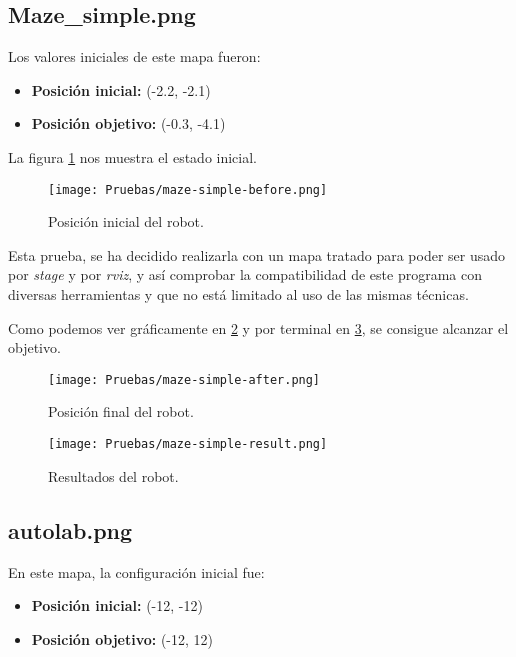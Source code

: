\documentclass[a4paper, 11pt]{article}
\begin{document}
	\subsection{Maze\_simple.png}
		Los valores iniciales de este mapa fueron:
		
		\begin{itemize}
			\item \textbf{Posición inicial:} (-2.2, -2.1)
			\item \textbf{Posición objetivo:} (-0.3, -4.1)
		\end{itemize}
		
		La figura \ref{begin-ms} nos muestra el estado inicial.
		
		\begin{figure}[H]
			\centering
			\texttt{[image: Pruebas/maze-simple-before.png]}
			\caption{Posición inicial del robot.}
			\label{begin-ms}	
		\end{figure}
		
		Esta prueba, se ha decidido realizarla con un mapa tratado para poder ser usado por \textit{stage}
		y por \textit{rviz}, y así comprobar la compatibilidad de este programa con diversas herramientas
		y que no está limitado al uso de las mismas técnicas.

		Como podemos ver gráficamente en \ref{end-ms} y por terminal en \ref{res-ms}, se consigue alcanzar
		el objetivo.

		\begin{figure}[H]
			\centering
			\texttt{[image: Pruebas/maze-simple-after.png]}
			\caption{Posición final del robot.}
			\label{end-ms}	
		\end{figure}
		
		\begin{figure}[H]
			\centering
			\texttt{[image: Pruebas/maze-simple-result.png]}
			\caption{Resultados del robot.}
			\label{res-ms}	
		\end{figure}
		
	
	\subsection{autolab.png}
		En este mapa, la configuración inicial fue:
	
		\begin{itemize}
			\item \textbf{Posición inicial:} (-12, -12)
			\item \textbf{Posición objetivo:} (-12, 12)
		\end{itemize}
		
\end{document}
